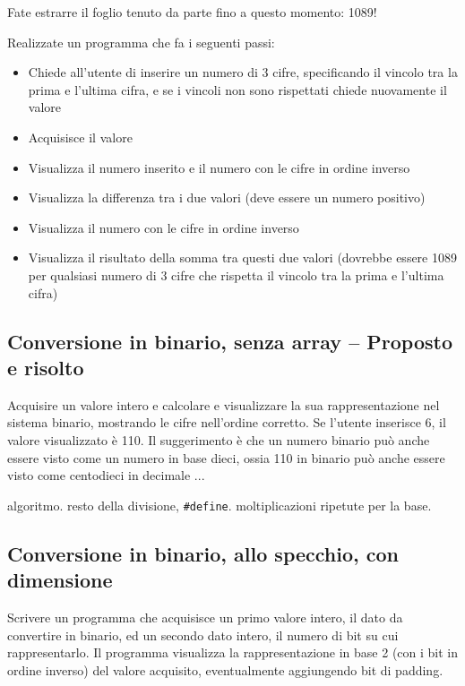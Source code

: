 Fate estrarre il foglio tenuto da parte fino a questo momento: 1089!

Realizzate un programma che fa i seguenti passi:\begin{itemize}
\item    Chiede all'utente di inserire un numero di 3 cifre, specificando il vincolo tra la prima e l'ultima cifra, e se i vincoli non sono rispettati chiede nuovamente il valore
\item    Acquisisce il valore
\item    Visualizza il numero inserito e il numero con le cifre in ordine inverso
\item    Visualizza la differenza tra i due valori (deve essere un numero positivo)
\item    Visualizza il numero con le cifre in ordine inverso
\item    Visualizza il risultato della somma tra questi due valori (dovrebbe essere 1089 per qualsiasi numero di 3 cifre che rispetta il vincolo tra la prima e l'ultima cifra)
\end{itemize}



\prosep{}

\subsection{Conversione in binario, senza array -- Proposto e risolto}
Acquisire un valore intero e calcolare e visualizzare la sua rappresentazione nel sistema binario, mostrando le cifre nell'ordine corretto. Se l'utente inserisce 6, il valore visualizzato \`e 110.
Il suggerimento \`e che un numero binario pu\`o anche essere visto come un numero in base dieci, ossia 110 in binario pu\`o anche essere visto come centodieci in decimale ...

\begin{tags}
algoritmo. resto della divisione, \texttt{\#define}. moltiplicazioni ripetute per la base.
\end{tags}



\subsection{Conversione in binario, allo specchio, con dimensione}
Scrivere un programma che acquisisce un primo valore intero, il dato da convertire in binario, ed un secondo dato intero, il numero di bit su cui rappresentarlo. Il programma visualizza la rappresentazione in base 2 (con i bit in ordine inverso) del valore acquisito, eventualmente aggiungendo bit di padding.


